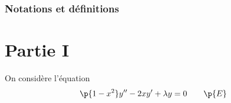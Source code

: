 \documentclass[a4paper,french,bookmarks]{article}
\begin{document}
    \renewcommand{\thesection}{\Roman{section}}
    \renewcommand{\thesubsection}{\Roman{section}.\Alph{subsection}}
    \renewcommand{\labelenumi}{\thesection.\arabic{enumi}.}
    \renewcommand*{\labelenumii}{\alph{enumii})}

    
    \subsubsection*{Notations et définitions}
    
    \section{Partie I}
    
    On considère l'équation
    \[ \p{1 - x^2}y'' - 2xy' + \lambda y = 0 \qquad\p{E} \]
    
\end{document}
